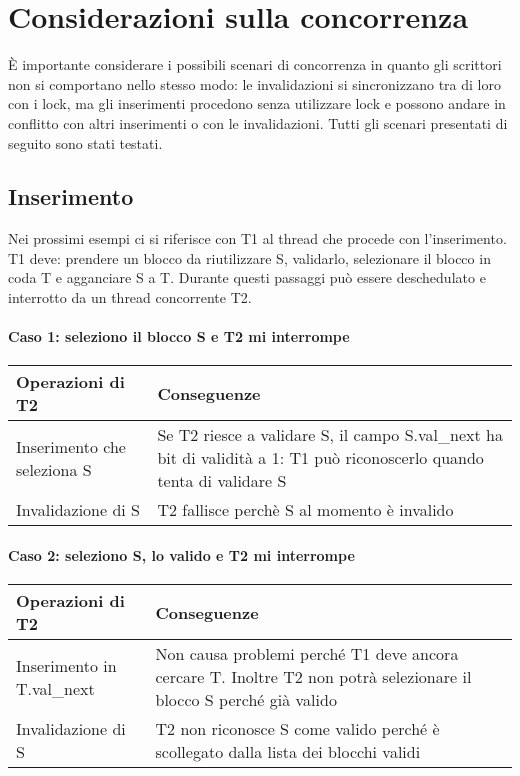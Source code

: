 \documentclass[a4paper,12pt,oneside]{book}
\begin{document}
	\chapter{Considerazioni sulla concorrenza}\label{chap:concorrenza}
	È importante considerare i possibili scenari di concorrenza in quanto gli scrittori non si comportano nello stesso modo: le invalidazioni si sincronizzano tra di loro con i lock, ma gli inserimenti procedono senza utilizzare lock e possono andare in conflitto con altri inserimenti o con le invalidazioni. Tutti gli scenari presentati di seguito sono stati testati.

	
	\section{Inserimento}
	Nei prossimi esempi ci si riferisce con T1 al thread che procede con l'inserimento. T1 deve: prendere un blocco da riutilizzare S, validarlo, selezionare il blocco in coda T e agganciare S a T. Durante questi passaggi può essere deschedulato e interrotto da un thread concorrente T2.

	\subsubsection{Caso 1: seleziono il blocco S e T2 mi interrompe}

\begin{table}[H]
\centering
\begin{tabular}{| l p{8cm} |}
	\hline
	Operazioni di T2 & Conseguenze \\ [0.5ex]
	\hline
	Inserimento che seleziona S & Se T2 riesce a validare S, il campo S.val\_next ha bit di validità a 1: T1 può riconoscerlo quando tenta di validare S \\ [1ex]
	Invalidazione di S & T2 fallisce perchè S al momento è invalido\\ [1ex]
	\hline
\end{tabular}
\label{table:1}
\end{table}

\subsubsection{Caso 2: seleziono S, lo valido e T2 mi interrompe}

\begin{table}[H]
\centering
\begin{tabular}{| l p{8cm} |}
	\hline
	Operazioni di T2 & Conseguenze \\ [0.5ex]
	\hline
	Inserimento in T.val\_next & Non causa problemi perché T1 deve ancora cercare T. Inoltre T2 non potrà selezionare il blocco S perché già valido\\ [1ex]
	Invalidazione di S & T2 non riconosce S come valido perché è scollegato dalla lista dei blocchi validi\\ [1ex]
	\hline
\end{tabular}
\label{table:1}
\end{table}
\end{document}
